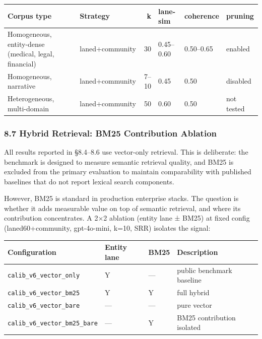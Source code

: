 \documentclass[
]{article}
\begin{document}
\begin{small}
\setlength{\tabcolsep}{4pt}
\begin{longtable}{p{2.1in}p{1.0in}rp{0.6in}p{0.6in}p{0.6in}}
\toprule
\textbf{Corpus type} & \textbf{Strategy} & \textbf{k} & \textbf{lane-sim} & \textbf{coherence} & \textbf{pruning} \\
\midrule
\endhead
Homogeneous, entity-dense (medical, legal, financial) & laned+community & 30 & 0.45--0.60 & 0.50--0.65 & enabled \\
Homogeneous, narrative & laned+community & 7--10 & 0.45 & 0.50 & disabled \\
Heterogeneous, multi-domain & laned+community & 50 & 0.60 & 0.50 & not tested \\
\bottomrule
\end{longtable}
\end{small}

\subsubsection{8.7 Hybrid Retrieval: BM25 Contribution
Ablation}\label{hybrid-retrieval-bm25-contribution-ablation}

All results reported in §8.4--8.6 use vector-only retrieval. This is
deliberate: the benchmark is designed to measure semantic retrieval
quality, and BM25 is excluded from the primary evaluation to maintain
comparability with published baselines that do not report lexical search
components.

However, BM25 is standard in production enterprise stacks. The question
is whether it adds measurable value on top of semantic retrieval, and
where its contribution concentrates. A 2×2 ablation (entity lane ± BM25)
at fixed config (laned60+community, gpt-4o-mini, k=10, SRR) isolates the
signal:

\begin{small}
\setlength{\tabcolsep}{4pt}
\begin{longtable}{p{1.8in}p{0.7in}p{0.5in}p{2.8in}}
\toprule
\textbf{Configuration} & \textbf{Entity lane} & \textbf{BM25} & \textbf{Description} \\
\midrule
\endhead
\texttt{calib\_v6\_vector\_only} & Y & — & public benchmark baseline \\
\texttt{calib\_v6\_vector\_bm25} & Y & Y & full hybrid \\
\texttt{calib\_v6\_vector\_bare} & — & — & pure vector \\
\texttt{calib\_v6\_vector\_bm25\_bare} & — & Y & BM25 contribution isolated \\
\bottomrule
\end{longtable}
\end{small}
\end{document}
